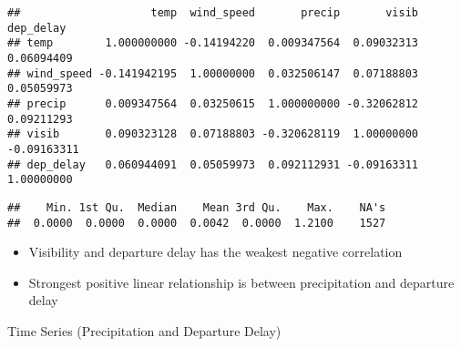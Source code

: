 \documentclass[
]{article}
\newenvironment{Shaded}{\begin{snugshade}}{\end{snugshade}}
\newcommand{\FunctionTok}[1]{\textcolor[rgb]{0.13,0.29,0.53}{\textbf{#1}}}
\newcommand{\NormalTok}[1]{#1}
\newcommand{\SpecialCharTok}[1]{\textcolor[rgb]{0.81,0.36,0.00}{\textbf{#1}}}
\begin{document}
\begin{verbatim}
##                    temp  wind_speed       precip       visib   dep_delay
## temp        1.000000000 -0.14194220  0.009347564  0.09032313  0.06094409
## wind_speed -0.141942195  1.00000000  0.032506147  0.07188803  0.05059973
## precip      0.009347564  0.03250615  1.000000000 -0.32062812  0.09211293
## visib       0.090323128  0.07188803 -0.320628119  1.00000000 -0.09163311
## dep_delay   0.060944091  0.05059973  0.092112931 -0.09163311  1.00000000
\end{verbatim}

\begin{Shaded}
\end{Shaded}

\begin{verbatim}
##    Min. 1st Qu.  Median    Mean 3rd Qu.    Max.    NA's 
##  0.0000  0.0000  0.0000  0.0042  0.0000  1.2100    1527
\end{verbatim}

\begin{itemize}
\item
  Visibility and departure delay has the weakest negative correlation
\item
  Strongest positive linear relationship is between precipitation and
  departure delay
\end{itemize}

Time Series (Precipitation and Departure Delay)
\end{document}
